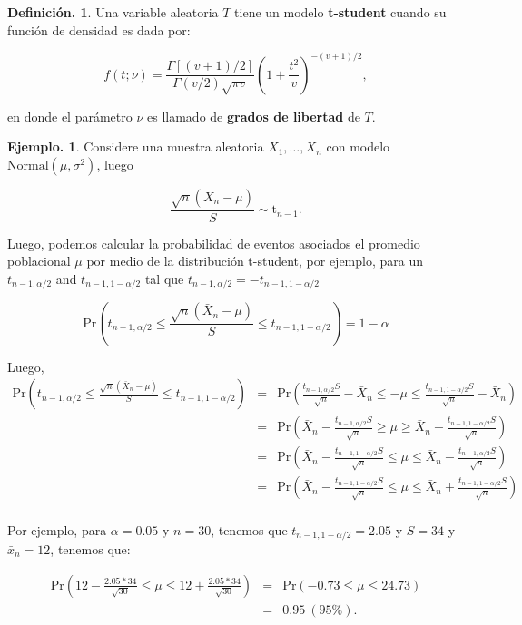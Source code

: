 \documentclass[]{book}
\theoremstyle{definition}
\newtheorem{definition}{Definición.}[chapter]
\theoremstyle{definition}
\newtheorem{example}{Ejemplo.}[chapter]
\theoremstyle{definition}
\theoremstyle{remark}
\begin{document}
\begin{definition}
\protect\hypertarget{def:unnamed-chunk-166}{}{\label{def:unnamed-chunk-166} }Una variable aleatoria \(T\) tiene un modelo \textbf{t-student} cuando su función
de densidad es dada por:

\[ f(t;\nu)=\frac{\Gamma[(v+1) / 2]}{\Gamma(v / 2) \sqrt{\pi
    v}}\left(1+\frac{t^{2}}{v}\right)^{-(v+1) / 2}, \]

en donde el parámetro \(\nu\) es llamado de \textbf{grados de libertad} de
\(T\).
\end{definition}

\begin{example}
\protect\hypertarget{exm:unnamed-chunk-167}{}{\label{exm:unnamed-chunk-167} }
Considere una muestra aleatoria \(X_1,\ldots, X_n\) con modelo
\(\mbox{Normal}(\mu,\sigma^2)\), luego

\[\frac{\sqrt{n}(\bar{X}_n - \mu)}{S} \sim \mbox{t}_{n-1}.\]

Luego, podemos calcular la probabilidad de eventos asociados el promedio
poblacional \(\mu\) por medio de la distribución t-student, por ejemplo,
para un \(t_{n-1, \alpha/2}\) and \(t_{n-1, 1-\alpha/2}\) tal que \(t_{n-1, \alpha/2}= - t_{n-1, 1-\alpha/2}\)

\[
\mbox{Pr}\left(t_{n-1, \alpha/2} \leq  \frac{\sqrt{n}(\bar{X}_n
- \mu)}{S} \leq         t_{n-1, 1-\alpha/2} \right) = 1 -\alpha
\]

Luego,
\begin{eqnarray*}  
\mbox{Pr}(t_{n-1, \alpha/2} \leq  \frac{\sqrt{n}(\bar{X}_n - \mu)}{S} \leq
          t_{n-1, 1-\alpha/2}) &= &  
  \mbox{Pr} \left(  \frac{t_{n-1, \alpha/2}S}{\sqrt{n}} - \bar{X}_n \leq
                  -\mu \leq   \frac{t_{n-1, 1- \alpha/2}S}{\sqrt{n}} -
                    \bar{X}_n     \right) \\
&=& \mbox{Pr} \left(  \bar{X}_n -  \frac{t_{n-1, \alpha/2}S}{\sqrt{n}} \geq
\mu \geq     \bar{X}_n -\frac{t_{n-1, 1- \alpha/2}S}{\sqrt{n}}    \right) \\
&=& \mbox{Pr} \left(  \bar{X}_n -  \frac{t_{n-1, 1- \alpha/2}S}{\sqrt{n}}
            \leq \mu \leq     \bar{X}_n -\frac{t_{n-1, \alpha/2}S}{\sqrt{n}}
            \right)\\
&=& \mbox{Pr} \left(  \bar{X}_n -  \frac{t_{n-1, 1- \alpha/2}S}{\sqrt{n}}
            \leq \mu \leq     \bar{X}_n +\frac{t_{n-1, 1- \alpha/2}S}{\sqrt{n}}
            \right)\\
\end{eqnarray*}

Por ejemplo, para \(\alpha=0.05\) y \(n=30\), tenemos que
\(t_{n-1, 1- \alpha /2} = 2.05\) y \(S=34\) y \(\bar{x}_n=12\),
tenemos que:

\begin{eqnarray*}
\mbox{Pr} \left( 12- \frac{2.05*34}{\sqrt{30}}
  \leq \mu \leq 12+ \frac{2.05*34}{\sqrt{30}}
  \right)
&=& \mbox{Pr} \left( -0.73   \leq \mu \leq  24.73 \right) \\
&=& 0.95 \ (95\%).
\end{eqnarray*}
\end{example}
\end{document}

